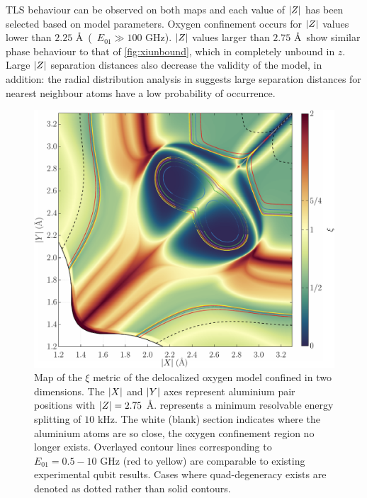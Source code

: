 TLS behaviour can be observed on both maps and each value of $\lvert Z\rvert$ has been selected based on model parameters.
Oxygen confinement occurs for $\lvert Z\rvert$ values lower than $2.25$ \AA\ (\ie\ $E_{01} \gg 100$ GHz).
$\lvert Z\rvert$ values larger than $2.75$ \AA\ show similar phase behaviour to that of \cref{fig:xiunbound}, which in completely unbound in $z$.
Large $\lvert Z\rvert$ separation distances also decrease the validity of the  model, in addition: the radial distribution analysis in  suggests large separation distances for nearest neighbour atoms have a low probability of occurrence.

\begin{figure}[htp]
  \includegraphics[width=\textwidth]{figures/xi275}
  \caption[$\xi$ Metric Phase Map, With $\abs{Z} = 2.75$ \AA]{\label{fig:xi275}Map of the $\xi$ metric of the delocalized oxygen model confined in two dimensions. The $\lvert X\rvert$ and $\lvert Y\rvert$ axes represent aluminium pair positions with $\abs{Z} = 2.75$ \AA.  represents a minimum resolvable energy splitting of $10$ kHz. The white (blank) section indicates where the aluminium atoms are so close, the oxygen confinement region no longer exists. Overlayed contour lines corresponding to $E_{01} = 0.5\!-\!10$ GHz (red to yellow) are comparable to existing experimental qubit results. Cases where quad-degeneracy exists are denoted as dotted rather than solid contours.}
\end{figure}

